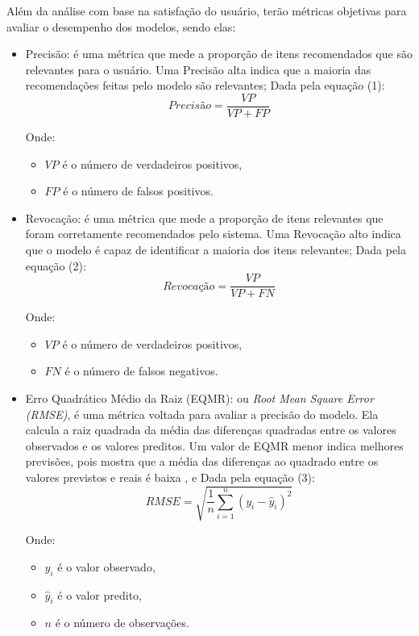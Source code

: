 Além da análise com base na satisfação do usuário, terão métricas objetivas para avaliar o desempenho dos modelos, sendo elas:
\begin{itemize}
    \item Precisão: é uma métrica que mede a proporção de itens recomendados que são relevantes para o usuário. 
    Uma Precisão alta indica que a maioria das recomendações feitas pelo modelo são relevantes;
    Dada pela equação (1):
    \[
    Precisão = \frac{VP}{VP + FP} \tag{1}
    \]

    Onde:
    \begin{itemize}
        \item \(VP\) é o número de verdadeiros positivos,
        \item \(FP\) é o número de falsos positivos.
    \end{itemize}
    \item Revocação: é uma métrica que mede a proporção de itens relevantes que foram corretamente recomendados pelo sistema.
    Uma Revocação alto indica que o modelo é capaz de identificar a maioria dos itens relevantes;
    Dada pela equação (2):
    \[
    Revocação = \frac{VP}{VP + FN} \tag{2}
    \]

    Onde:
    \begin{itemize}
        \item \(VP\) é o número de verdadeiros positivos,
        \item \(FN\) é o número de falsos negativos.
    \end{itemize}
    \item Erro Quadrático Médio da Raiz (EQMR): ou \textit{Root Mean Square Error (RMSE)}, é uma métrica voltada para avaliar
    a precisão do modelo. Ela calcula a raiz quadrada da média das diferenças 
    quadradas entre os valores observados e os valores preditos.
    Um valor de EQMR menor indica melhores previsões, pois mostra que a média das diferenças ao quadrado entre os valores 
    previstos e reais é baixa \cite{wang2018analysis}, e 
    Dada pela equação (3):
    \[
    RMSE = \sqrt{\frac{1}{n} \sum_{i=1}^{n} (y_i - \hat{y}_i)^2} \tag{3}
    \]

    Onde:
    \begin{itemize}
        \item \(y_i\) é o valor observado,
        \item \(\hat{y}_i\) é o valor predito,
        \item \(n\) é o número de observações.
    \end{itemize}


\end{itemize}
